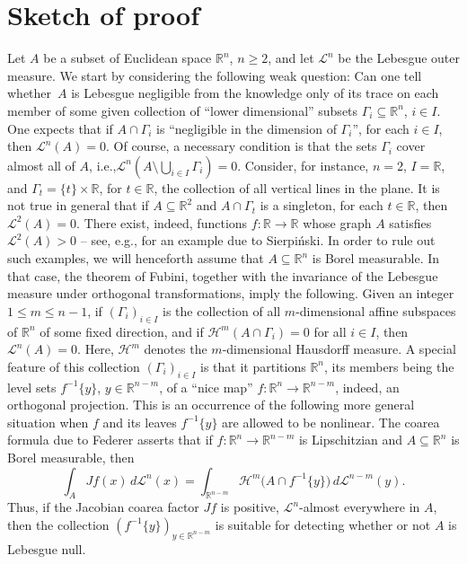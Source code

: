 \documentclass[11pt]{article}
\newcommand{\ie}{i.e.,\xspace}
\theoremstyle{definition}
\theoremstyle{jepanonymous}
\theoremstyle{plain}
\newcommand{\R}{\mathbb{R}}
\newcommand{\Rn}{\R^n}
\newcommand{\calH}{\mathscr{H}}
\newcommand{\calL}{\mathscr{L}}
\let\subset\subseteq
\begin{document}
\section{Sketch of proof}
Let $A$ be a subset of Euclidean space $\Rn$, $n \geq 2$, and let $\calL^n$ be the Lebesgue outer measure.
We start by considering the following weak question: Can one tell whether~$A$ is Lebesgue negligible from the knowledge only of its trace on each member of some given collection of ``lower dimensional'' subsets $\Gamma_i \subset \Rn$, $i \in I$.
One expects that if \hbox{$A \cap \Gamma_i$} is ``negligible in the dimension of $\Gamma_i$'', for each $i \in I$, then \hbox{$\calL^n(A)=0$}.
Of course, a necessary condition is that the sets $\Gamma_i$ cover almost all of $A$, \ie \hbox{$\calL^n(A \setminus \bigcup_{i \in I} \Gamma_i)=0$}.
Consider, for instance, $n=2$, $I = \R$, and $\Gamma_t = \{t\} \times \R$, for $t \in \R$, the collection of all vertical lines in the plane.
It is not true in general that if $A \subset \R^2$ and $A \cap \Gamma_t$ is a singleton, for each $t \in \R$, then $\calL^2(A)=0$.
There exist, indeed, functions $f: \R \to \R$ whose graph $A$ satisfies $\calL^2(A) > 0$ -- see, e.g., \cite[Chap.\,2, Th.\,4]{KHARAZISHVILI} for an example due to Sierpi\'nski.
In order to rule out such exam\-ples, we will henceforth assume that $A \subset \Rn$ is Borel measurable.
In that case, the theorem of Fubini, together with the invariance of the Lebesgue measure under orthogonal transformations, imply the following.
Given an integer $1 \leq m \leq n-1$, if $(\Gamma_i)_{i \in I}$ is the collection of all $m$-dimensional affine subspaces of $\Rn$ of some fixed direction, and if $\calH^m(A \cap \Gamma_i)=0$ for all $i \in I$, then $\calL^n(A)=0$.
Here, $\calH^m$ denotes the $m$-dimensional Hausdorff measure.
A special feature of this collection $(\Gamma_i)_{i \in I}$ is that it partitions $\Rn$, its members being the level sets $f^{-1}\{y\}$, $y \in \R^{n-m}$, of a ``nice map'' $f: \Rn \to \R^{n-m}$, indeed, an orthogonal projection.
This is an occurrence of the following more general situation when $f$ and its leaves $f^{-1}\{y\}$ are allowed to be nonlinear.
The coarea formula due to Federer \cite{FED.59} asserts that if $f: \Rn \to \R^{n-m}$ is Lipschitzian and $A \subset \Rn$ is Borel measurable, then
\begin{equation*}
\int_A Jf(x) \,d\calL^n(x) = \int_{\R^{n-m}} \calH^m\bigl(A \cap f^{-1}\{y \}\bigr) \,d\calL^{n-m}(y).
\end{equation*}
Thus, if the Jacobian coarea factor $Jf$ is positive, $\calL^n$-almost everywhere in $A$, then the collection $\left(f^{-1}\{y\} \right)_{y \in \R^{n-m}}$ is suitable for detecting whether or not $A$ is Lebesgue null.
\end{document}
